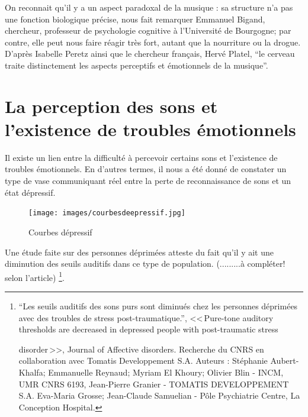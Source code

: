 On reconnait qu'il y a un aspect paradoxal de la musique : sa structure n'a pas une 
fonction biologique précise, nous fait remarquer Emmanuel Bigand,  chercheur, professeur 
de psychologie cognitive à l'Université 
de Bourgogne; par contre, elle peut nous faire réagir très fort, autant que la nourriture ou la 
drogue. \autocite[Voir ch. 3 p. 35, "Vous avez l'oreille musicale"]{bigand:cerveau}
D'après Isabelle Peretz
\autocite[<<\,Les agnosies auditives\,>>, pp. 205--216]{seron.baron.ea:neuropsychologie}
ainsi que le chercheur français, Hervé Platel,%
\autocite[pp. 223--224]{platel_neuropsychology_2002}
 \enquote{le cerveau traite distinctement les aspects perceptifs et émotionnels de la 
 musique}.




\section{La perception des sons et l'existence de troubles
  émotionnels}

Il existe un lien entre la difficulté à percevoir certains sons 
et l'existence 
de troubles émotionnels. En d'autres termes, il nous a été donné de
constater un type de vase communiquant réel entre la perte de reconnaissance de sons et
un état dépressif.




\begin{figure}
	\centering
	\texttt{[image: images/courbesdeepressif.jpg]}
	\caption{Courbes dépressif}
	\label{fig:courbes du dépressif}
      \end{figure}

Une étude faite sur des personnes déprimées atteste du 
fait qu'il y ait une diminution des seuils auditifs dans ce type de
population. (.........à compléter! selon l'article)
\footnote{``Les seuils auditifs des sons purs 
	sont diminués chez les personnes déprimées avec des
	troubles de stress post-traumatique.'', <<\,Pure-tone auditory 
	thresholds are decreased in depressed people with post-traumatic stress 



	disorder\,>>, Journal of Affective disorders. Recherche du CNRS en collaboration
	avec Tomatis Developpement S.A. Auteurs : Stéphanie 
	Aubert-Khalfa; Emmanuelle Reynaud; Myriam El Khoury;
	Olivier Blin - INCM, UMR CNRS 6193, Jean-Pierre Granier -
	TOMATIS DEVELOPPEMENT S.A. Eva-Maria Grosse; Jean-Claude 
	Samuelian - Pôle Psychiatrie Centre, La Conception Hospital.}.



